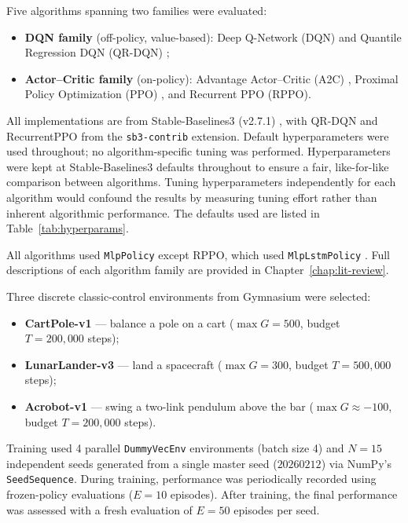 Five algorithms spanning two families were evaluated:
\begin{itemize}
  \item \textbf{DQN family} (off-policy, value-based):
        Deep Q-Network (\textsc{DQN}) \citep{mnih2015human} and
        Quantile Regression DQN (\textsc{QR-DQN}) \citep{dabney2018qrdqn};
  \item \textbf{Actor--Critic family} (on-policy):
        Advantage Actor--Critic (\textsc{A2C}) \citep{mnih2016a3c},
        Proximal Policy Optimization (\textsc{PPO}) \citep{schulman2017ppo}, and
        Recurrent PPO (\textsc{RPPO}).
\end{itemize}
All implementations are from Stable-Baselines3 (v2.7.1) \citep{raffin2021sb3},
with QR-DQN and RecurrentPPO from the \texttt{sb3-contrib} extension.
Default hyperparameters were used throughout; no algorithm-specific tuning
was performed.
Hyperparameters were kept at Stable-Baselines3 defaults throughout to ensure a fair, like-for-like comparison between algorithms. Tuning hyperparameters independently for each algorithm would confound the results by measuring tuning effort rather than inherent algorithmic performance. The defaults used are listed in Table~\ref{tab:hyperparams}.

All algorithms used \texttt{MlpPolicy} except RPPO, which
used \texttt{MlpLstmPolicy} \citep{raffin2021sb3}.
Full descriptions of each algorithm family are provided in Chapter~\ref{chap:lit-review}.


Three discrete classic-control environments from Gymnasium were selected:
\begin{itemize}
  \item \textbf{CartPole-v1} --- balance a pole on a cart
        ($\max G = 500$, budget $T = 200{,}000$ steps);
  \item \textbf{LunarLander-v3} --- land a spacecraft
        ($\max G = 300$, budget $T = 500{,}000$ steps);
  \item \textbf{Acrobot-v1} --- swing a two-link pendulum above the bar
        ($\max G \approx -100$, budget $T = 200{,}000$ steps).
\end{itemize}

Training used 4 parallel \texttt{DummyVecEnv} environments (batch size 4) and $N = 15$ independent seeds generated from a single master seed ($20260212$) via NumPy's \texttt{SeedSequence}. During training, performance was periodically recorded using frozen-policy evaluations ($E = 10$ episodes). After training, the final performance was assessed with a fresh evaluation of $E = 50$ episodes per seed.


